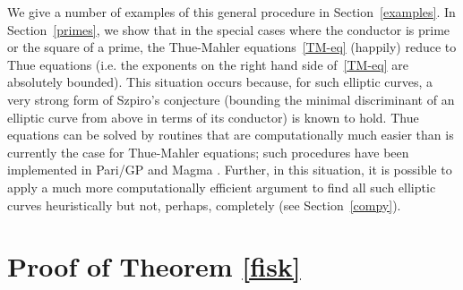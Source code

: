 We give a number of examples of this general procedure in Section~\ref{examples}. In Section~\ref{primes}, we show that  in the 
special cases where the conductor is prime or the square of a prime, the Thue-Mahler equations~\eqref{TM-eq} (happily) 
reduce to Thue equations (i.e. the exponents on the right hand side of~\eqref{TM-eq} are absolutely bounded).  This situation occurs because, for such elliptic curves, a very strong form of Szpiro's conjecture (bounding the minimal discriminant of an elliptic curve from above in terms of its conductor) is known to hold. Thue equations 
can be solved by routines that are computationally much easier than is currently the case for Thue-Mahler equations; such procedures have been implemented in Pari/GP \cite{PARI2}  and Magma 
\cite{magma}. Further, in this situation,  it is possible to apply a much more computationally efficient argument to find all such elliptic 
curves heuristically but not, perhaps, completely (see Section~\ref{compy}).
 

\section{Proof of Theorem \ref{fisk}} \label{BigProof}

